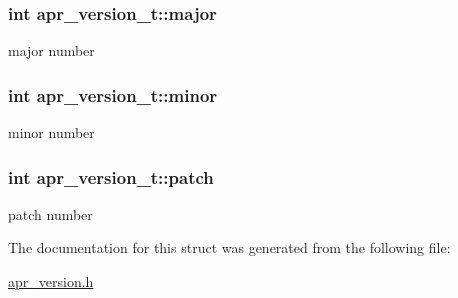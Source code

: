 \subsubsection[{\texorpdfstring{major}{major}}]{\setlength{\rightskip}{0pt plus 5cm}int apr\+\_\+version\+\_\+t\+::major}\hypertarget{structapr__version__t_a0ae64fee85387834ab76d9f9288373ab}{}\label{structapr__version__t_a0ae64fee85387834ab76d9f9288373ab}
major number 
\subsubsection[{\texorpdfstring{minor}{minor}}]{\setlength{\rightskip}{0pt plus 5cm}int apr\+\_\+version\+\_\+t\+::minor}\hypertarget{structapr__version__t_aab0a1e8362517416389631bceeeedbad}{}\label{structapr__version__t_aab0a1e8362517416389631bceeeedbad}
minor number 
\subsubsection[{\texorpdfstring{patch}{patch}}]{\setlength{\rightskip}{0pt plus 5cm}int apr\+\_\+version\+\_\+t\+::patch}\hypertarget{structapr__version__t_a98a629a88e776642d6e527d7535e0791}{}\label{structapr__version__t_a98a629a88e776642d6e527d7535e0791}
patch number 

The documentation for this struct was generated from the following file\+:\begin{DoxyCompactItemize}
\item 
\hyperlink{apr__version_8h}{apr\+\_\+version.\+h}\end{DoxyCompactItemize}
